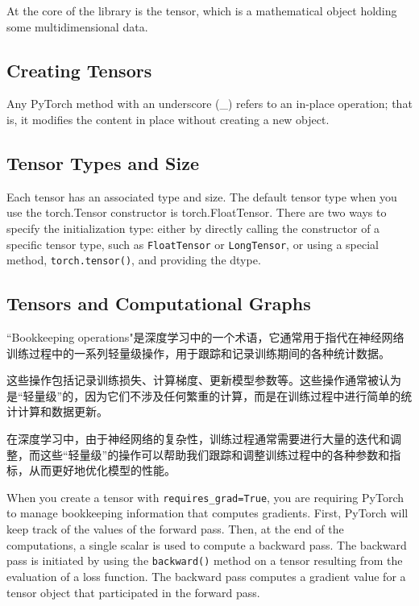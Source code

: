 At the core of the library is the tensor, which is a mathematical object holding some multidimensional data.

\subsection{Creating Tensors}
Any PyTorch method with an underscore (\_) refers to an in-place operation; that is, it modifies the content in place without creating a new
object.

\subsection{Tensor Types and Size}
Each tensor has an associated type and size. The default tensor type when you use the
torch.Tensor constructor is torch.FloatTensor. There are two ways to specify the initialization
type: either by directly calling the constructor of a specific tensor type, such as \verb|FloatTensor| or \verb|LongTensor|, or using a special method, \verb|torch.tensor()|, and providing
the dtype.

\subsection{Tensors and Computational Graphs}
``Bookkeeping operations"是深度学习中的一个术语，它通常用于指代在神经网络训练过程中的一系列轻量级操作，用于跟踪和记录训练期间的各种统计数据。

这些操作包括记录训练损失、计算梯度、更新模型参数等。这些操作通常被认为是“轻量级”的，因为它们不涉及任何繁重的计算，而是在训练过程中进行简单的统计计算和数据更新。

在深度学习中，由于神经网络的复杂性，训练过程通常需要进行大量的迭代和调整，而这些“轻量级”的操作可以帮助我们跟踪和调整训练过程中的各种参数和指标，从而更好地优化模型的性能。

When you create a tensor with \verb|requires_grad=True|, you are requiring PyTorch to manage bookkeeping information that computes gradients. First, PyTorch will keep track of the values of the forward pass. Then, at the end of the computations, a single scalar is used to compute a backward pass. The backward pass is initiated by using the \verb|backward()| method on a tensor resulting from the evaluation of a loss function. The backward pass computes a gradient value for a tensor object that participated in the forward pass.
